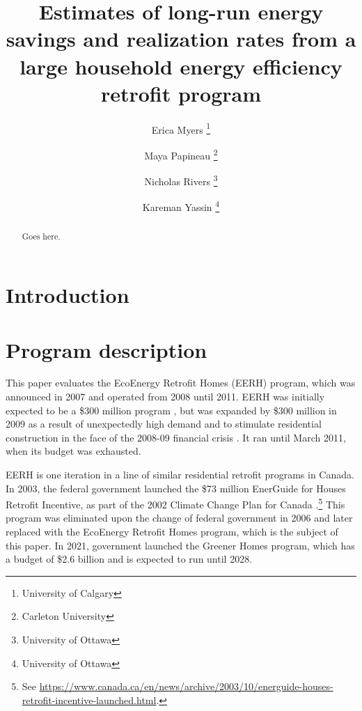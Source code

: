 \documentclass{article}
\author{
    Erica Myers \thanks{University of Calgary}
    \and
    Maya Papineau \thanks{Carleton University}
    \and
    Nicholas Rivers \thanks{University of Ottawa}
    \and 
    Kareman Yassin \thanks{University of Ottawa}
}
\title{
    Estimates of long-run energy savings and realization rates from a large household energy efficiency retrofit program
}
\begin{document}
\maketitle

\begin{abstract}
	Goes here.
\end{abstract}

\section{Introduction}

\section{Program description}
This paper evaluates the EcoEnergy Retrofit Homes (EERH) program, which was announced in 2007 and operated from 2008 until 2011. EERH was initially expected to be a \$300 million program \citep{budget2007}, but was expanded by \$300 million in 2009 as a result of unexpectedly high demand and to stimulate residential construction in the face of the 2008-09 financial crisis \citep{budget2009}. It ran until March 2011, when its budget was exhausted.

EERH is one iteration in a line of similar residential retrofit programs in Canada. In 2003, the federal government launched the \$73 million EnerGuide for Houses Retrofit Incentive, as part of the 2002 Climate Change Plan for Canada \citep{canada2002climateplan}.\footnote{See \url{https://www.canada.ca/en/news/archive/2003/10/energuide-houses-retrofit-incentive-launched.html}.} This program was eliminated upon the change of federal government in 2006 and later replaced with the EcoEnergy Retrofit Homes program, which is the subject of this paper. In 2021, government launched the Greener Homes program, which has a budget of \$2.6 billion and is expected to run until 2028.
\end{document}
